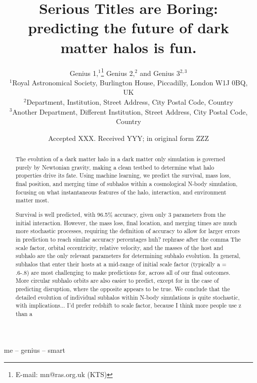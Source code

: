 \documentclass[fleqn,usenatbib]{mnras}
\title[Abbie=Smart Person]{Serious Titles are Boring: predicting the future of dark matter halos is fun.}
\author[Very Smart]{
Genius 1,$^{1}$\thanks{E-mail: mn@ras.org.uk (KTS)}
Genius 2,$^{2}$
and Genius 3$^{2,3}$
\\
$^{1}$Royal Astronomical Society, Burlington House, Piccadilly, London W1J 0BQ, UK\\
$^{2}$Department, Institution, Street Address, City Postal Code, Country\\
$^{3}$Another Department, Different Institution, Street Address, City Postal Code, Country
}
\date{Accepted XXX. Received YYY; in original form ZZZ}
\newcommand\khb[1]{{\color{blue}#1}}
\begin{document}
\label{firstpage}
\pagerange{\pageref{firstpage}--\pageref{lastpage}}
\maketitle

\begin{abstract}
\khb{The evolution of a dark matter halo in a dark matter only simulation is governed purely by Newtonian gravity, making a clean testbed to determine what halo properties drive its fate. Using machine learning, we predict the survival, mass loss, final position, and merging time of subhalos within a cosmological N-body simulation,
focusing on what instantaneous features of the halo, interaction, and environment matter most.}



Survival is well predicted, with 96.5\% accuracy, given only 3 parameters from the initial interaction. However, the mass loss, final location, and merging times are much more stochastic processes, requiring the definition of accuracy to allow for larger errors in prediction to reach similar accuracy percentages \khb{huh? rephrase after the comma} The scale factor, orbital eccentricity, relative velocity, and the masses of the host and subhalo are the only relevant parameters for determining subhalo evolution. In general, subhalos that enter their hosts at a mid-range of initial scale factor (typically a = .6-.8) are most challenging to make predictions for, across all of our final outcomes. More circular subhalo orbits are also easier to predict, except for in the case of predicting disruption, where the opposite appears to be true. We conclude that the detailed evolution of individual subhalos within N-body simulations is quite stochastic, with implications... \khb{I'd prefer redshift to scale factor, because I think more people use z than a}
\end{abstract}

\begin{keywords}
me -- genius -- smart
\end{keywords}


\end{document}
